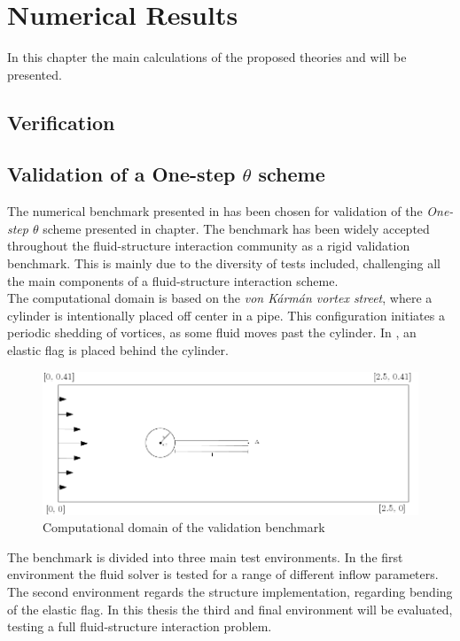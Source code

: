 \chapter{Numerical Results}

In this chapter the main calculations of the proposed theories and will be presented.

\section{Verification}

\section{Validation of a One-step $\theta$ scheme}
The numerical benchmark presented in \cite{Hron2006} has been chosen for validation of the \textit{One-step $\theta$} scheme presented in chapter. The benchmark has been widely accepted throughout the fluid-structure interaction community as a rigid validation benchmark. This is mainly due to the diversity of tests included, challenging all the main components of a fluid-structure interaction scheme. \\
The computational domain is based on the \textit{von Kármán vortex street}, where a cylinder is intentionally placed off center in a pipe. This configuration initiates a periodic shedding of vortices, as some fluid moves past the cylinder. In \cite{Hron2006}, an elastic flag is placed behind the cylinder. \\

\begin{figure}
  \centering
    \includegraphics[scale=0.5]{./Fig/turekflag.png}
      \caption{Computational domain of the validation benchmark}
\end{figure}
\newpage
The benchmark is divided into three main test environments.
In the first environment the fluid solver is tested for a range of different inflow parameters. \\
The second environment regards the structure implementation, regarding bending of the elastic flag. In this thesis the third and final environment will be evaluated, testing a full fluid-structure interaction problem. 



